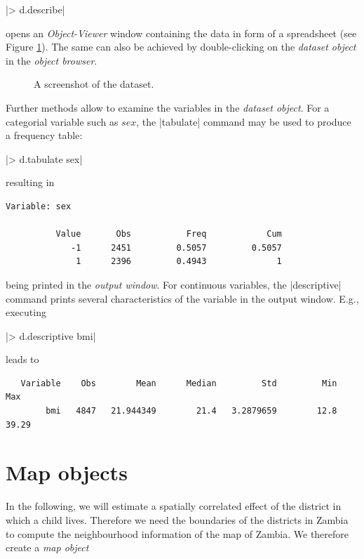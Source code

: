 |> d.describe|

opens an {\it Object-Viewer} window containing the data in form of a spreadsheet (see Figure \ref{mcmc:screenshot}). The same
can also be achieved by double-clicking on the {\it dataset object} in the {\it object browser}.

\vspace{1cm}

\begin{figure}[ht]
\begin{center}
 {\it\caption{A
screenshot of the dataset.\label{mcmc:screenshot}}}
\end{center}
\end{figure}

Further methods allow to examine the variables in the {\it dataset object}. For a categorial variable such as $\mathit{sex}$,
the |tabulate| command may be used to produce a frequency table:

|> d.tabulate sex|

resulting in

\begin{verbatim}
Variable: sex

          Value       Obs           Freq            Cum
             -1      2451         0.5057         0.5057
              1      2396         0.4943              1
\end{verbatim}

being printed in the {\it output window}. For continuous variables,  the |descriptive| command prints several characteristics
of the variable in the {output window}. E.g., executing

|> d.descriptive bmi|

leads to

\begin{verbatim}
   Variable    Obs        Mean      Median         Std         Min         Max
        bmi   4847   21.944349        21.4   3.2879659        12.8       39.29
\end{verbatim}

\section{Map objects}\label{mcmc:maps}

In the following, we will estimate a spatially correlated effect of the district in which a child lives. Therefore we need the
boundaries of the districts in Zambia to compute the neighbourhood information of the map of Zambia. We therefore create a {\it
map object}

